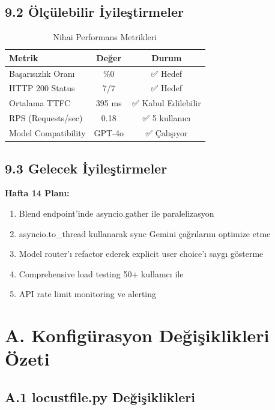 \documentclass[12pt,a4paper]{report}
\begin{document}
\subsection{9.2 Ölçülebilir İyileştirmeler}

\begin{table}[h]
\centering
\caption{Nihai Performans Metrikleri}
\begin{tabular}{l|c|c}
\toprule
\textbf{Metrik} & \textbf{Değer} & \textbf{Durum} \\
\midrule
Başarısızlık Oranı & \%0 & ✅ Hedef \\
HTTP 200 Status & 7/7 & ✅ Hedef \\
Ortalama TTFC & 395 ms & ✅ Kabul Edilebilir \\
RPS (Requests/sec) & 0.18 & ✅ 5 kullanıcı \\
Model Compatibility & GPT-4o & ✅ Çalışıyor \\
\bottomrule
\end{tabular}
\end{table}

\subsection{9.3 Gelecek İyileştirmeler}

\textbf{Hafta 14 Planı:}
\begin{enumerate}
    \item Blend endpoint'inde asyncio.gather ile paralelizasyon
    \item asyncio.to\_thread kullanarak sync Gemini çağrılarını optimize etme
    \item Model router'ı refactor ederek explicit user choice'ı saygı gösterme
    \item Comprehensive load testing 50+ kullanıcı ile
    \item API rate limit monitoring ve alerting
\end{enumerate}

\newpage

\appendix

\section{A. Konfigürasyon Değişiklikleri Özeti}

\subsection{A.1 locustfile.py Değişiklikleri}
\end{document}
